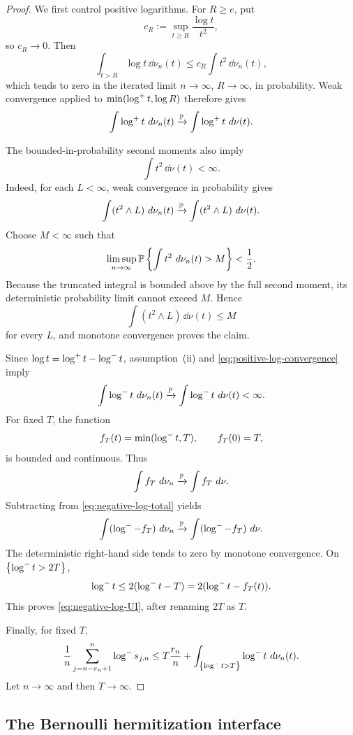 \begin{proof}
We first control positive logarithms. For $R\ge e$, put
\[
  c_R:=\sup_{t\ge R}\frac{\log t}{t^2},
\]
so $c_R\to0$. Then
\[
  \int_{t>R}\log t\,\dd\nu_n(t)
  \le c_R\int t^2\,\dd\nu_n(t),
\]
which tends to zero in the iterated limit $n\to\infty$, $R\to\infty$, in probability. Weak convergence applied to $\min(\log^{+} t,\log R)$ therefore gives
\begin{equation}\label{eq:positive-log-convergence}
  \int\log^{+} t\,\,d\nu_n(t)
  \xrightarrow{\mathbb P}
  \int\log^{+} t\,\,d\nu(t).
\end{equation}

The bounded-in-probability second moments also imply
\[
  \int t^2\,\dd\nu(t)<\infty.
\]
Indeed, for each $L<\infty$, weak convergence in probability gives
\[
  \int(t^2\wedge L)\,\,d\nu_n(t)
  \xrightarrow{\mathbb P}
  \int(t^2\wedge L)\,\,d\nu(t).
\]
Choose $M<\infty$ such that
\[
  \limsup_{n\to\infty}
  \mathbb P\left\{\int t^2\,\,d\nu_n(t)>M\right\}<\frac12.
\]
Because the truncated integral is bounded above by the full second moment, its deterministic probability limit cannot exceed $M$. Hence
\[
  \int(t^2\wedge L)\,\dd\nu(t)\le M
\]
for every $L$, and monotone convergence proves the claim.

Since $\log t=\log^{+} t-\log^{-} t$, assumption~(ii) and \eqref{eq:positive-log-convergence} imply
\begin{equation}\label{eq:negative-log-total}
  \int\log^{-} t\,\,d\nu_n(t)
  \xrightarrow{\mathbb P}
  \int\log^{-} t\,\,d\nu(t)<\infty.
\end{equation}
For fixed $T$, the function
\[
  f_T(t)=\min(\log^{-} t,T),
  \qquad f_T(0)=T,
\]
is bounded and continuous. Thus
\[
  \int f_T\,\,d\nu_n
  \xrightarrow{\mathbb P}
  \int f_T\,\,d\nu.
\]
Subtracting from \eqref{eq:negative-log-total} yields
\[
  \int(\log^{-}-f_T)\,\,d\nu_n
  \xrightarrow{\mathbb P}
  \int(\log^{-}-f_T)\,\,d\nu.
\]
The deterministic right-hand side tends to zero by monotone convergence. On $\left\{\log^{-} t>2T\right\}$,
\[
  \log^{-} t\le2(\log^{-} t-T)=2(\log^{-} t-f_T(t)).
\]
This proves \eqref{eq:negative-log-UI}, after renaming $2T$ as $T$.

Finally, for fixed $T$,
\[
  \frac1n\sum_{j=n-r_n+1}^n\log^{-} s_{j,n}
  \le T\frac{r_n}{n}
  +\int_{\left\{\log^{-} t>T\right\}}\log^{-} t\,\,d\nu_n(t).
\]
Let $n\to\infty$ and then $T\to\infty$.
\end{proof}

\subsection{The Bernoulli hermitization interface}

